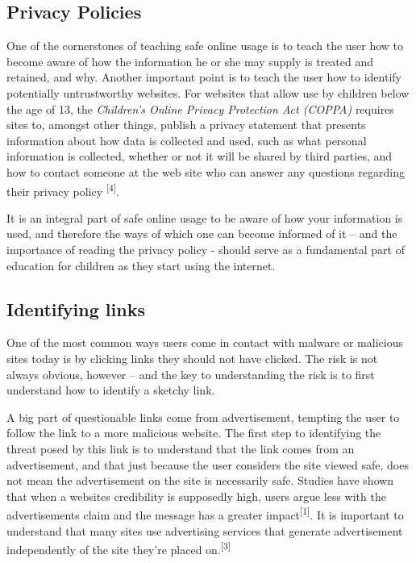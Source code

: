 \documentclass[twocolumn,letterpaper]{article}
\begin{document}
\subsection[Privacy Policies]{\bfseries \textup{Privacy Policies}}
One of the cornerstones of teaching safe online usage is to teach the user how to become aware of how the information he
or she may supply is treated and retained, and why. Another important point is to teach the user how to identify
potentially untrustworthy websites. For websites that allow use by children below the age of 13, the \textit{Children's
Online Privacy Protection Act (COPPA) }requires sites to, amongst other things, publish a privacy statement that
presents information about how data is collected and used, such as what personal information is collected, whether or
not it will be shared by third parties, and how to contact someone at the web site who can answer any questions
regarding their privacy policy \textsuperscript{[4]}.

It is an integral part of safe online usage to be aware of how your information is used, and therefore the ways of which
one can become informed of it – and the importance of reading the privacy policy - should serve as a fundamental part
of education for children as they start using the internet. 

\subsection[Identifying links]{\bfseries \textup{Identifying links}}
One of the most common ways users come in contact with malware or malicious sites today is by clicking links they should
not have clicked. The risk is not always obvious, however – and the key to understanding the risk is to first
understand how to identify a sketchy link. 

A big part of questionable links come from advertisement, tempting the user to follow the link to a more malicious
website. The first step to identifying the threat posed by this link is to understand that the link comes from an
advertisement, and that just because the user considers the site viewed safe, does not mean the advertisement on the
site is necessarily safe. Studies have shown that when a websites credibility is supposedly high, users argue less with
the advertisements claim and the message has a greater impact\textsuperscript{[1]}. It is important to understand that
many sites use advertising services that generate advertisement independently of the site they're placed
on.\textsuperscript{[3]}
\end{document}
